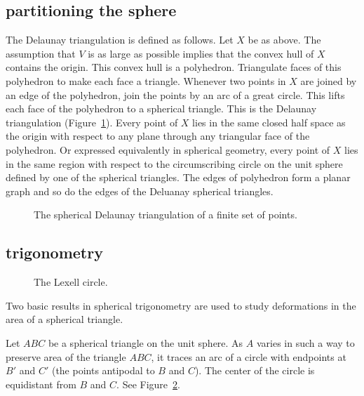 \subsection{partitioning the sphere}

The Delaunay triangulation is defined as follows.  Let $X$ be as above.  The
assumption that $V$ is as large as possible implies that the convex hull of $X$
contains the origin.  This convex hull is a polyhedron.  Triangulate faces of
this polyhedron to make each face a triangle.  Whenever two points in $X$ are
joined by an edge of the polyhedron, join the points by an arc of a great circle.
This lifts each face of the polyhedron to a spherical triangle.  This is the Delaunay
triangulation (Figure~\ref{fig:delaunay}).  Every point of $X$ lies in the same closed half space as the origin with
respect to any plane  through any triangular face of the polyhedron.  
Or expressed equivalently in 
spherical geometry, every point of $X$ lies in the same region with respect to the
circumscribing circle on the unit sphere defined by one of the spherical triangles.
The edges of polyhedron form a planar graph and so do the edges of the Deluanay spherical triangles.

\begin{figure}[htb]
  \centering
  \caption{The spherical 
   Delaunay triangulation of a finite set of points.}
  \label{fig:delaunay}
\end{figure}


\subsection{trigonometry}

\begin{figure}[htb]
  \centering
  \caption{The Lexell circle.}
  \label{fig:lexell}
\end{figure}



Two basic results in spherical trigonometry are used to
study deformations in the area of a spherical triangle.

\begin{lemma}[Lexell] Let $ABC$ be a spherical triangle on the unit sphere.  As $A$ varies
in such a way to preserve area of the triangle $ABC$, it traces an arc of
a circle with endpoints at $B'$ and $C'$ (the points antipodal to $B$ and $C$).
The center of the circle is equidistant from $B$ and $C$.  See Figure~\ref{fig:lexell}.
\end{lemma}

